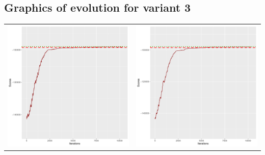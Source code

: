 \documentclass[]{scrartcl}
\begin{document}
\clearpage

\subsection{Graphics of evolution for variant 3}

\begin{table}[h!]
\begin{tabular}{cc}
\includegraphics[scale = 0.4]{./figs/hepar2/v3/25/boundsEvolution-10352.pdf} & 
\includegraphics[scale = 0.4]{./figs/hepar2/v3/50/boundsEvolution-10352.pdf} \\

\end{tabular}
\end{table}
\end{document}
